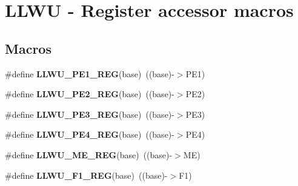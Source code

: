 \hypertarget{group__LLWU__Register__Accessor__Macros}{}\section{L\+L\+WU -\/ Register accessor macros}
\label{group__LLWU__Register__Accessor__Macros}
\subsection*{Macros}
\begin{DoxyCompactItemize}
\item 
\#define {\bfseries L\+L\+W\+U\+\_\+\+P\+E1\+\_\+\+R\+EG}(base)~((base)-\/$>$P\+E1)\hypertarget{group__LLWU__Register__Accessor__Macros_gac122d2548e2c00069618b75fc2dda5da}{}\label{group__LLWU__Register__Accessor__Macros_gac122d2548e2c00069618b75fc2dda5da}

\item 
\#define {\bfseries L\+L\+W\+U\+\_\+\+P\+E2\+\_\+\+R\+EG}(base)~((base)-\/$>$P\+E2)\hypertarget{group__LLWU__Register__Accessor__Macros_ga5202d127ca8b88f5920c93ebbb9b9144}{}\label{group__LLWU__Register__Accessor__Macros_ga5202d127ca8b88f5920c93ebbb9b9144}

\item 
\#define {\bfseries L\+L\+W\+U\+\_\+\+P\+E3\+\_\+\+R\+EG}(base)~((base)-\/$>$P\+E3)\hypertarget{group__LLWU__Register__Accessor__Macros_ga31faa7fe2240e17d24eef3748a994673}{}\label{group__LLWU__Register__Accessor__Macros_ga31faa7fe2240e17d24eef3748a994673}

\item 
\#define {\bfseries L\+L\+W\+U\+\_\+\+P\+E4\+\_\+\+R\+EG}(base)~((base)-\/$>$P\+E4)\hypertarget{group__LLWU__Register__Accessor__Macros_gabae264ac23ea3d486f55e8934a91df70}{}\label{group__LLWU__Register__Accessor__Macros_gabae264ac23ea3d486f55e8934a91df70}

\item 
\#define {\bfseries L\+L\+W\+U\+\_\+\+M\+E\+\_\+\+R\+EG}(base)~((base)-\/$>$ME)\hypertarget{group__LLWU__Register__Accessor__Macros_ga5e41f250b27a820d46d083915e94f18f}{}\label{group__LLWU__Register__Accessor__Macros_ga5e41f250b27a820d46d083915e94f18f}

\item 
\#define {\bfseries L\+L\+W\+U\+\_\+\+F1\+\_\+\+R\+EG}(base)~((base)-\/$>$F1)\hypertarget{group__LLWU__Register__Accessor__Macros_ga5f542b8bcaf97360c66a00993f229242}{}\label{group__LLWU__Register__Accessor__Macros_ga5f542b8bcaf97360c66a00993f229242}


\end{DoxyCompactItemize}
